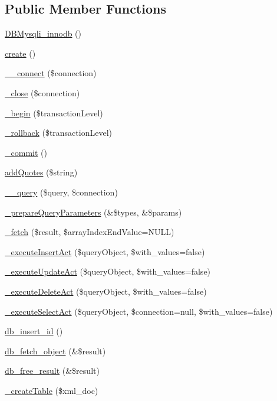 \subsection*{Public Member Functions}
\begin{DoxyCompactItemize}
\item 
\hyperlink{classDBMysqli__innodb_ac4c325b70a705426271410ca912d1b49}{D\+B\+Mysqli\+\_\+innodb} ()
\item 
\hyperlink{classDBMysqli__innodb_a70756f753a255650d67931f06d675608}{create} ()
\item 
\hyperlink{classDBMysqli__innodb_ab6db4cf73da0e11ed0045a07d751e334}{\+\_\+\+\_\+connect} (\$connection)
\item 
\hyperlink{classDBMysqli__innodb_a566f80a95a8b1e84155feb0868a90c84}{\+\_\+close} (\$connection)
\item 
\hyperlink{classDBMysqli__innodb_a5b5894c0354f5342aa06ebd8af56ebc5}{\+\_\+begin} (\$transaction\+Level)
\item 
\hyperlink{classDBMysqli__innodb_a6437715ee202c96bb413e1c98316ef21}{\+\_\+rollback} (\$transaction\+Level)
\item 
\hyperlink{classDBMysqli__innodb_a0ec5faa054822bd226fa6c404b17e674}{\+\_\+commit} ()
\item 
\hyperlink{classDBMysqli__innodb_aaf7572b62d23465db5d7bba8930004fc}{add\+Quotes} (\$string)
\item 
\hyperlink{classDBMysqli__innodb_a02098642ca57c84b9061172e8a3b8d17}{\+\_\+\+\_\+query} (\$query, \$connection)
\item 
\hyperlink{classDBMysqli__innodb_a0955069ad72c16d2652573e5883f037d}{\+\_\+prepare\+Query\+Parameters} (\&\$types, \&\$params)
\item 
\hyperlink{classDBMysqli__innodb_ae3c56ef21f1ba07dfd602534544e6fc9}{\+\_\+fetch} (\$result, \$array\+Index\+End\+Value=N\+U\+L\+L)
\item 
\hyperlink{classDBMysqli__innodb_a7f76f4789d2a6b1614345c4c69071546}{\+\_\+execute\+Insert\+Act} (\$query\+Object, \$with\+\_\+values=false)
\item 
\hyperlink{classDBMysqli__innodb_ad45981920c2258e135292b1ffedaecfb}{\+\_\+execute\+Update\+Act} (\$query\+Object, \$with\+\_\+values=false)
\item 
\hyperlink{classDBMysqli__innodb_a3ba692ef0c7a7d89ba5c7deee0fdd601}{\+\_\+execute\+Delete\+Act} (\$query\+Object, \$with\+\_\+values=false)
\item 
\hyperlink{classDBMysqli__innodb_abae8c007e13d7811697dadb3f9ef3930}{\+\_\+execute\+Select\+Act} (\$query\+Object, \$connection=null, \$with\+\_\+values=false)
\item 
\hyperlink{classDBMysqli__innodb_aec47da41558bdf42e9d2fe31c2ce87f2}{db\+\_\+insert\+\_\+id} ()
\item 
\hyperlink{classDBMysqli__innodb_a676cdff9d50d9398c0c2e3f9d50e8c0a}{db\+\_\+fetch\+\_\+object} (\&\$result)
\item 
\hyperlink{classDBMysqli__innodb_a0eb1700db91867677a8f7fa9e2f25298}{db\+\_\+free\+\_\+result} (\&\$result)
\item 
\hyperlink{classDBMysqli__innodb_adea880ad43bc281fbdae806bd25d6cce}{\+\_\+create\+Table} (\$xml\+\_\+doc)
\end{DoxyCompactItemize}
